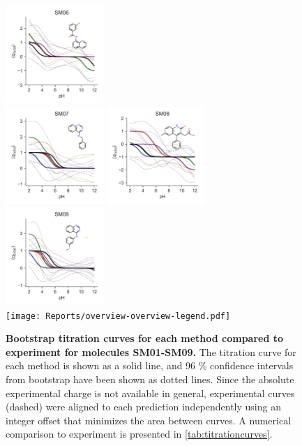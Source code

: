 \documentclass[9pt,lineno,final]{elife}
\begin{document}
\begin{figure}[hbt]
	\includegraphics[width=0.33\textwidth]{Reports/overview-SM06-titration-bootstrap-molecule.pdf}	 \\
		\includegraphics[width=0.33\textwidth]{Reports/overview-SM07-titration-bootstrap-molecule.pdf}
	\includegraphics[width=0.33\textwidth]{Reports/overview-SM08-titration-bootstrap-molecule.pdf}
	\includegraphics[width=0.33\textwidth]{Reports/overview-SM09-titration-bootstrap-molecule.pdf}	 \\
	\texttt{[image: Reports/overview-overview-legend.pdf]}
	\caption{{\bf Bootstrap titration curves for each method compared to experiment for molecules SM01-SM09.} The titration curve for each method is shown as a solid line, and 96 \% confidence intervals from bootstrap have been shown as dotted lines. Since the absolute experimental charge is not available in general, experimental curves (dashed) were aligned to each prediction independently using an integer offset that minimizes the area between curves. A numerical comparison to experiment is presented in \cref{tab:titrationcurves}.
	\label{fig:charge-curves1}}
	\end{figure}
	
\end{document}
